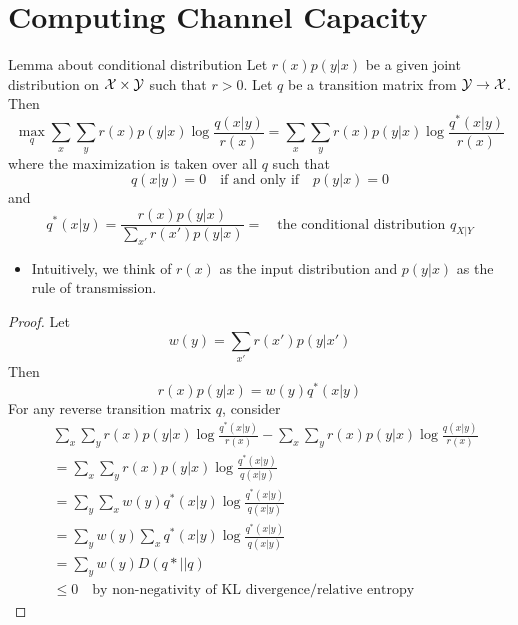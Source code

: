 \documentclass[../main.tex]{subfiles}
\begin{document}
\section{Computing Channel Capacity}
\begin{bbox}{Lemma about conditional distribution}
    Let $r(x)p(y|x)$ be a given joint distribution on $\mathcal{X}\times\mathcal{Y}$ such that $r>0$. Let $q$ be a transition matrix from $\mathcal{Y}\to \mathcal{X}$. Then \[
    \max_{q} \sum_x\sum_y  r(x)p(y|x)\log\frac{q(x|y)}{r(x)} = \sum_x\sum_y r(x)p(y|x)\log\frac{q^*(x|y)}{r(x)}
    \] where the maximization is taken over all $q$ such that \[
    q(x|y)=0 \quad \text{if and only if} \quad p(y|x)=0
    \] and 
    \[
    q^*(x|y)=\frac{r(x)p(y|x)}{\sum_{x'}r(x')p(y|x)} = \quad \text{the conditional distribution $q_{X|Y}$}
    \]
    \begin{itemize}
        \item Intuitively, we think of $r(x)$ as the input distribution and $p(y|x)$ as the rule of transmission.
    \end{itemize}
    \begin{proof}
        Let \[
        w(y)=\sum_{x'}r(x')p(y|x')
        \]
        Then \[
        r(x)p(y|x)=w(y)q^*(x|y)
        \]
        For any reverse transition matrix $q$, consider \begin{align*}
            &\sum_x\sum_y r(x)p(y|x)\log\frac{q^*(x|y)}{r(x)} - \sum_x\sum_y  r(x)p(y|x)\log\frac{q(x|y)}{r(x)}\\
            &=\sum_x\sum_y r(x)p(y|x)\log\frac{q^*(x|y)}{q(x|y)}\\
            &=\sum_y\sum_x w(y)q^*(x|y)\log\frac{q^*(x|y)}{q(x|y)}\\
            &=\sum_y w(y)\sum_x q^*(x|y)\log\frac{q^*(x|y)}{q(x|y)}\\
            &=\sum_y w(y) D(q*||q)\\
            &\leq 0 \quad \text{by non-negativity of KL divergence/relative entropy}
            \end{align*}
    \end{proof}
\end{bbox}
\end{document}
